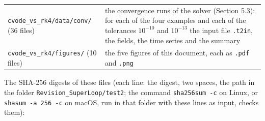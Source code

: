 \documentclass[
  10pt,
]{article}
\begin{document}
\begin{longtable}[]{@{}
  >{\raggedright\arraybackslash}p{}
  >{\raggedright\arraybackslash}p{}@{}}
\texttt{cvode\_vs\_rk4/data/conv/} (36 files) & the convergence runs of
the solver (Section 5.3): for each of the four examples and each of the
tolerances \(10^{-10}\) and \(10^{-13}\) the input file \texttt{.t2in},
the fields, the time series and the summary \\
\texttt{cvode\_vs\_rk4/figures/} (10 files) & the five figures of this
document, each as \texttt{.pdf} and \texttt{.png} \\
\end{longtable}

The SHA-256 digests of these files (each line: the digest, two spaces,
the path in the folder \texttt{Revision\_SuperLoop/test2}; the command
\texttt{sha256sum\ -c} on Linux, or \texttt{shasum\ -a\ 256\ -c} on
macOS, run in that folder with these lines as input, checks them):
\end{document}

